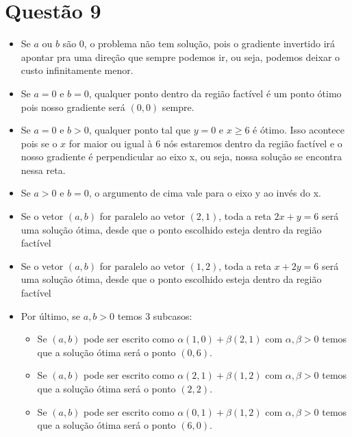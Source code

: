 \documentclass[11pt]{article}
\begin{document}
\section{Questão 9}
\label{sec:org223bbfc}
\begin{itemize}
\item Se \(a\) ou \(b\) são 0, o problema não tem solução, pois o gradiente invertido irá apontar pra uma direção que sempre podemos
ir, ou seja, podemos deixar o custo infinitamente menor.
\item Se \(a = 0\) e \(b = 0\), qualquer ponto dentro da região factível é um ponto ótimo pois nosso gradiente será \((0, 0)\) sempre.
\item Se \(a = 0\) e \(b > 0\), qualquer ponto tal que \(y = 0\) e \(x \geq 6\) é ótimo. Isso acontece pois se o \(x\) for maior ou igual à 6 nós estaremos dentro da região factível e o nosso gradiente é perpendicular ao eixo x, ou seja, nossa solução se encontra nessa reta.
\item Se \(a > 0\) e \(b = 0\), o argumento de cima vale para o eixo y ao invés do x.
\item Se o vetor \((a, b)\) for paralelo ao vetor \((2, 1)\), toda a reta \(2x+y = 6\) será uma solução ótima, desde que o ponto escolhido esteja dentro da região factível
\item Se o vetor \((a, b)\) for paralelo ao vetor \((1, 2)\), toda a reta \(x+2y = 6\) será uma solução ótima, desde que o ponto escolhido esteja dentro da região factível
\item Por último, se \(a, b > 0\) temos 3 subcasos:
\begin{itemize}
\item Se \((a, b)\) pode ser escrito como \(\alpha(1, 0)+\beta(2, 1)\) com \(\alpha,\beta>0\) temos que a solução ótima será o ponto \((0, 6)\).
\item Se \((a, b)\) pode ser escrito como \(\alpha(2, 1)+\beta(1, 2)\) com \(\alpha,\beta>0\) temos que a solução ótima será o ponto \((2, 2)\).
\item Se \((a, b)\) pode ser escrito como \(\alpha(0, 1)+\beta(1, 2)\) com \(\alpha,\beta>0\) temos que a solução ótima será o ponto \((6, 0)\).
\end{itemize}
\end{itemize}
\end{document}

